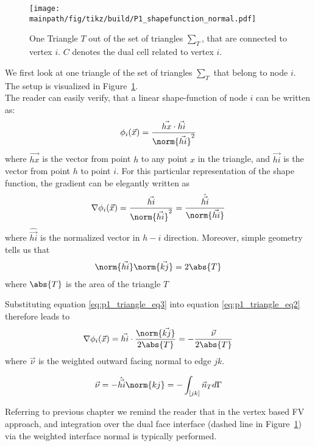\documentclass[../main.tex]{subfiles}
\begin{document}
\begin{figure}[h]
\centering
\texttt{[image: \\mainpath/fig/tikz/build/P1\_shapefunction\_normal.pdf]}
\caption{One Triangle $T$ out of the set of triangles $\sum_T$, that are connected to vertex $i$. $C$ denotes the dual cell related to vertex $i$.}
\label{fig:p1_linear_shape_function}
\end{figure}


We first look at one triangle of the set of triangles $\sum_T$ that belong to node $i$.\\
The setup is visualized in Figure~\ref{fig:p1_linear_shape_function}.\\
The reader can easily verify, that a linear shape-function of node $i$ can be written as:
\begin{align}\label{eq:p1_triangle_eq1}
  \phi_i(\vec{x})=\frac{\vec{hx}\cdot\vec{hi}}{\norm{\vec{hi}}^2}
\end{align}
where $\vec{hx}$ is the vector from point $h$ to any point $x$ in the triangle, and $\vec{hi}$ is the vector from point $h$ to point $i$.
For this particular representation of the shape function, the gradient can be elegantly written as
\begin{align}\label{eq:p1_triangle_eq2}
\nabla \phi_i(\vec{x})=\frac{\vec{hi}}{\norm{\vec{hi}}^2}=\frac{\hat{\vec{hi}}}{\norm{\vec{hi}}}
\end{align}
where $\hat{\vec{hi}}$ is the normalized vector in $h-i$ direction.
Moreover, simple geometry tells us that
\begin{align}\label{eq:p1_triangle_eq3}
\norm{\vec{hi}} \norm{\vec{kj}} = 2 \abs{T}
\end{align}
where $\abs{T}$ is the area of the triangle $T$

Substituting equation \ref{eq:p1_triangle_eq3} into equation \ref{eq:p1_triangle_eq2} therefore leads to
\begin{align}\label{eq:p1_triangle_eq4}
\nabla \phi_i(\vec{x})= \vec{hi}\cdot\frac{\norm{\vec{kj}}}{2\abs{T}}=-\frac{\vec{\nu}}{2\abs{T}}
\end{align}
where $\vec{\nu}$ is the weighted outward facing normal to edge $jk$.

\begin{align}
    \vec{\nu}=-\hat{\vec{hi}} \norm{kj} = -\int_{[jk]} \vec{n}_T d \Gamma
\end{align}

Referring to previous chapter we remind the reader that in the vertex based \ac{FV} approach, and integration over the dual face interface (dashed line in Figure~\ref{fig:p1_linear_shape_function}) via the weighted interface normal is typically performed.
\end{document}
